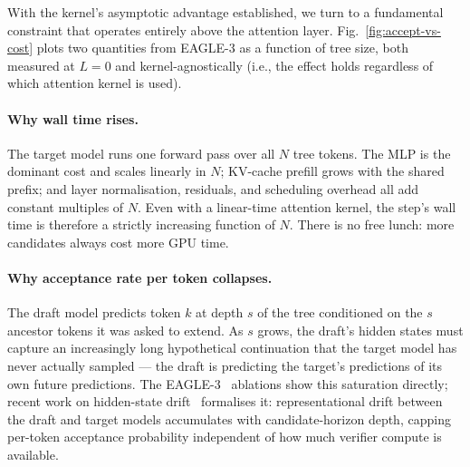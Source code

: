 \documentclass{article}
\newcommand{\numtokens}{N}
\newcommand{\prefixlen}{L}
\begin{document}
With the kernel's asymptotic advantage established, we turn to a
fundamental constraint that operates entirely above the attention
layer. Fig.~\ref{fig:accept-vs-cost} plots two quantities from
EAGLE-3 as a function of tree size, both measured at $\prefixlen{=}0$
and kernel-agnostically (i.e., the effect holds regardless of which
attention kernel is used).

\paragraph{Why wall time rises.}
The target model runs one forward pass over all $\numtokens$ tree
tokens. The MLP is the dominant cost and scales linearly in
$\numtokens$; KV-cache prefill grows with the shared prefix; and
layer normalisation, residuals, and scheduling overhead all add
constant multiples of $\numtokens$. Even with a linear-time attention
kernel, the step's wall time is therefore a strictly increasing
function of $\numtokens$. There is no free lunch: more candidates
always cost more GPU time.

\paragraph{Why acceptance rate per token collapses.}
The draft model predicts token $k$ at depth $s$ of the tree
conditioned on the $s$ ancestor tokens it was asked to extend. As $s$
grows, the draft's hidden states must capture an increasingly long
hypothetical continuation that the target model has never actually
sampled --- the draft is predicting the target's predictions of its
own future predictions. The EAGLE-3~\cite{li2025eagle3} ablations
show this saturation directly; recent work on hidden-state
drift~\cite{drift2026} formalises it: representational drift between
the draft and target models accumulates with candidate-horizon depth,
capping per-token acceptance probability independent of how much
verifier compute is available.
\end{document}
